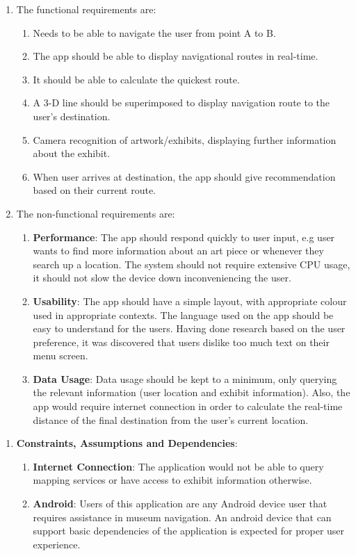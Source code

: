 \begin{enumerate}
    \item The functional requirements are:
    \begin{enumerate}
        \item Needs to be able to navigate the user from point A to B.
        \item The app should be able to display navigational routes in real-time.
        \item It should be able to calculate the quickest route.
        \item A 3-D line should be superimposed to display navigation route to the user's destination.
        \item Camera recognition of artwork/exhibits, displaying further information about the exhibit.
        \item When user arrives at destination, the app should give recommendation based on their current route.
    \end{enumerate}
    \item The non-functional requirements are:
    \begin{enumerate}
        \item \textbf{Performance}: The app should respond quickly to user input, e.g user wants to find more information about an art piece or whenever they search up a location. The system should not require extensive CPU usage, it should not slow the device down inconveniencing the user.
        \item \textbf{Usability}: The app should have a simple layout, with appropriate colour used in appropriate contexts. The language used on the app should be easy to understand for the users. Having done research based on the user preference, it was discovered that users dislike too much text on their menu screen.
        \item \textbf{Data Usage}: Data usage should be kept to a minimum, only querying the relevant information (user location and exhibit information). Also, the app would require internet connection in order to calculate the real-time distance of the final destination from the user's current location.
    \end{enumerate}
\end{enumerate}

\begin{enumerate}
    \item \textbf{Constraints, Assumptions and Dependencies}:
    \begin{enumerate}
        \item \textbf{Internet Connection}: The application would not be able to query mapping services or have access to exhibit information otherwise.
        \item \textbf{Android}: Users of this application are any Android device user that requires assistance in museum navigation. An android device that can support basic dependencies of the application is expected for proper user experience.
    \end{enumerate}
\end{enumerate}